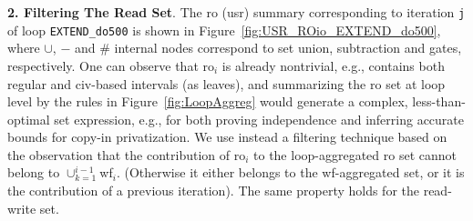 \documentclass{sig-alternate}
\begin{document}
\vspace{1ex}

{\bf 2. Filtering The Read Set}. The {\sc ro} ({\sc usr}) summary corresponding 
to iteration {\tt j} of loop {\tt EXTEND\_do500} is shown in 
Figure~\ref{fig:USR_ROio_EXTEND_do500}, where $\cup$, $-$ and $\#$ internal nodes 
correspond to set union, subtraction and gates, respectively.   
One can observe that {\sc ro}$_{i}$ is already nontrivial, e.g.,
contains both regular and {\sc civ}-based intervals (as leaves), and summarizing the 
{\sc ro} set at loop level by the rules in Figure~\ref{fig:LoopAggreg} would 
generate a complex, less-than-optimal set expression, e.g., for both proving 
independence and inferring accurate bounds for copy-in privatization.
%
We use instead a filtering technique based on the observation that
the contribution of {\sc ro}$_i$ to the loop-aggregated
{\sc ro} set cannot belong to $\cup_{k=1}^{i-1}${\sc wf}$_i$.
(Otherwise it either belongs to the {\sc wf}-aggregated set, or it is 
the contribution of a previous iteration). The same property holds for
the read-write set.
\end{document}
